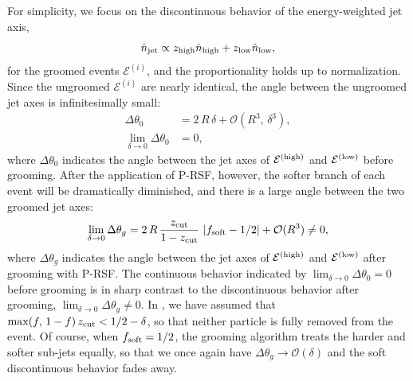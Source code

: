 For simplicity, we focus on the discontinuous behavior of the energy-weighted jet axis,
%
\begin{equation}
    \hat n_{\rm jet} \propto z_{\rm high} \hat n_{\rm high} +  z_{\rm low} \hat n_{\rm low}
    ,
\end{equation}
for the groomed events \(\mathcal E^{(i)}\), and the proportionality holds up to normalization.
%
Since the ungroomed \(\mathcal{E}^{(i)}\) are nearly identical, the angle between the ungroomed jet axes is infinitesimally small:
\begin{subequations}
\begin{align}
    \Delta\theta_{0}
   &=
    2\,R\,\delta
    +
    \mathcal{O}(R^3,\,\delta^3)
    ,
    \\
    \lim_{\delta\to 0}\Delta\theta_0 &= 0
    ,
\end{align}
\end{subequations}
where \(\Delta\theta_{0}\) indicates the angle between the jet axes of \(\mathcal{E}^{(\rm high)}\) and \(\mathcal{E}^{(\rm low)}\) before grooming.
%
After the application of P-RSF, however, the softer branch of each event will be dramatically diminished, and there is a large angle between the two groomed jet axes:
%
\begin{equation}
    \lim_{\delta\to 0}\Delta \theta_{g}
    =
    2\,R
    \,
    \frac{\zcut}{1 - \zcut}
    \,
    \left|f_{\rm soft} - 1/2\right|
    +
    \mathcal{O}(R^3)
    \neq 0
    \label{eq:prsf_soft_discont}
    ,
\end{equation}
where \(\Delta\theta_{g}\) indicates the angle between the jet axes of \(\mathcal{E}^{(\rm high)}\) and \(\mathcal{E}^{(\rm low)}\) after grooming with P-RSF.
%
The continuous behavior indicated by \(\lim_{\delta\to 0} \Delta\theta_0 = 0\) before grooming is in sharp contrast to the discontinuous behavior after grooming, \(\lim_{\delta\to 0} \Delta\theta_g \neq 0\).
%
In , we have assumed that \(\max(f,\,1-f)\,z_{\rm cut} < 1/2 - \delta\), so that neither particle is fully removed from the event.
%
Of course, when \(f_{\rm soft} = 1/2\), the grooming algorithm treats the harder and softer sub-jets equally, so that we once again have \(\Delta \theta_g \to \mathcal{O}(\delta)\) and the soft discontinuous behavior fades away.

